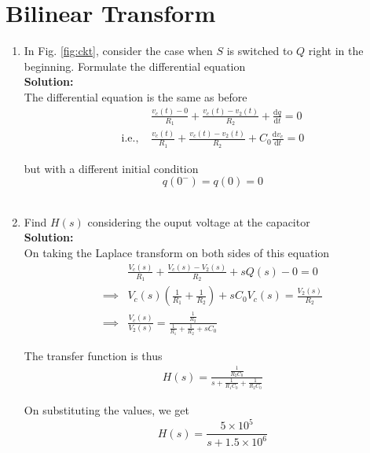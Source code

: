 \documentclass[journal,12pt,twocolumn]{IEEEtran}
\newcommand{\solution}{\noindent \textbf{Solution: }}
\providecommand{\brak}[1]{\ensuremath{\left(#1\right)}}
\providecommand{\der}[1]{\mathrm{d} #1}
\numberwithin{equation}{section}
\numberwithin{figure}{section}
\renewcommand\thesection{\arabic{section}}
\begin{document}
	\section{Bilinear Transform}
	\begin{enumerate}[label=\thesection.\arabic*,ref=\thesection.\theenumi]
		\item In Fig. \ref{fig:ckt}, consider the case when $S$ is switched to $Q$ right in the beginning. Formulate the differential equation\\
	
		\solution\\
			The differential equation is the same as before 
			\begin{align}
				&\frac{v_c(t) - 0}{R_1} + \frac{v_c(t) - v_2(t)}{R_2} + \frac{\der{q}}{\der{t}} = 0 \\
				\text{i.e., } &\frac{v_c(t)}{R_1} + \frac{v_c(t) - v_2(t)}{R_2} + C_0\frac{\der{v_c}}{\der{t}} = 0
			\end{align}
	
			but with a different initial condition
			\begin{equation}
				q(0^-) = q(0) = 0
			\end{equation}\ \\

		\item Find $H(s)$ considering the ouput voltage at the capacitor\\

		\solution\\
			On taking the Laplace transform on both sides of this equation
			\begin{align}
				&\frac{V_c(s)}{R_1} + \frac{V_c(s) - V_2(s)}{R_2} + sQ(s) - 0 = 0 \\
				\implies &V_c(s) \brak{\frac{1}{R_1} + \frac{1}{R_2}} + sC_0V_c(s) = \frac{V_2(s)}{R_2} \\
				\implies &\frac{V_c(s)}{V_2(s)} = \frac{\frac{1}{R_2}}{\frac{1}{R_1} + \frac{1}{R_2} + sC_0}
			\end{align}
	
			The transfer function is thus
			\begin{align}
				H(s) = \frac{\frac{1}{R_2C_0}}{s + \frac{1}{R_1C_0} + \frac{1}{R_2C_0}}
			\end{align}
	
			On substituting the values, we get
			\begin{equation}
				H(s) = \frac{5 \times 10^5}{s + 1.5 \times 10^6}
			\end{equation}\ \\


\end{enumerate}
\end{document}
